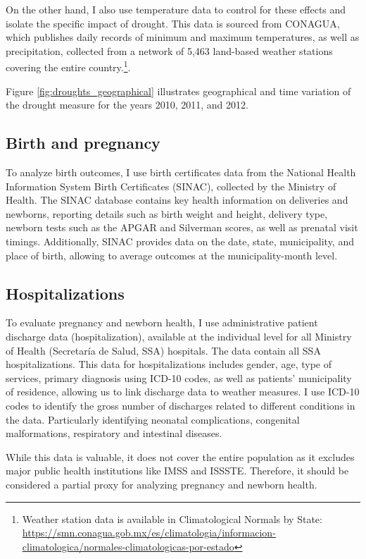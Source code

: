 \documentclass[12pt, oneside]{article}      %
\begin{document}
On the other hand, I also use temperature data to control for these effects and isolate the specific impact of drought. This data is sourced from CONAGUA, which publishes daily records of minimum and maximum temperatures, as well as precipitation, collected from a network of 5,463 land-based weather stations covering the entire country.\footnote{Weather station data is available in Climatological Normals by State: \url{https://smn.conagua.gob.mx/es/climatologia/informacion-climatologica/normales-climatologicas-por-estado}}.

Figure \ref{fig:droughts_geographical} illustrates geographical and time variation of the drought measure for the years 2010, 2011, and 2012.

\subsection{Birth and pregnancy}

To analyze birth outcomes, I use birth certificates data from the National Health Information System Birth Certificates (SINAC), collected by the Ministry of Health. The SINAC database contains key health information on deliveries and newborns, reporting details such as birth weight and height, delivery type, newborn tests such as the APGAR and Silverman scores, as well as prenatal visit timings. Additionally, SINAC provides data on the date, state, municipality, and place of birth, allowing to average outcomes at the municipality-month level.

\subsection{Hospitalizations}

To evaluate pregnancy and newborn health, I use administrative patient discharge data (hospitalization), available at the individual level for all Ministry of Health (Secretaría de Salud, SSA) hospitals. The data contain all SSA hospitalizations. This data for hospitalizations includes gender, age, type of services, primary diagnosis using ICD-10 codes, as well as patients' municipality of residence, allowing us to link discharge data to weather measures.  I use ICD-10 codes to identify the gross number of discharges related to different conditions in the data. Particularly identifying neonatal complications, congenital malformations, respiratory and intestinal diseases.

While this data is valuable, it does not cover the entire population as it excludes major public health institutions like IMSS and ISSSTE. Therefore, it should be considered a partial proxy for analyzing pregnancy and newborn health.
\end{document}

